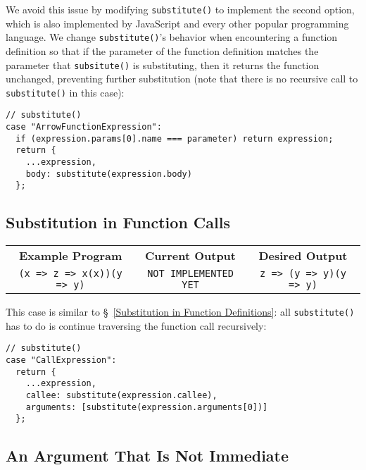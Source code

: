 \documentclass[12pt, oneside]{book}
\begin{document}
We avoid this issue by modifying \texttt{substitute()} to implement the second option, which is also implemented by JavaScript and every other popular programming language. We change \texttt{substitute()}’s behavior when encountering a function definition so that if the parameter of the function definition matches the parameter that \texttt{subsitute()} is substituting, then it returns the function unchanged, preventing further substitution (note that there is no recursive call to \texttt{substitute()} in this case):

\begin{verbatim}
// substitute()
case "ArrowFunctionExpression":
  if (expression.params[0].name === parameter) return expression;
  return {
    ...expression,
    body: substitute(expression.body)
  };
\end{verbatim}

\subsection{Substitution in Function Calls}

\begin{center}
\begin{tabular}{c|c|c}
\textbf{Example Program} & \textbf{Current Output} & \textbf{Desired Output} \\
\texttt{(x => z => x(x))(y => y)} & \texttt{NOT IMPLEMENTED YET} & \texttt{z => (y => y)(y => y)} \\
\end{tabular}
\end{center}

\noindent This case is similar to §~\ref{Substitution in Function Definitions}: all \texttt{substitute()} has to do is continue traversing the function call recursively:

\begin{verbatim}
// substitute()
case "CallExpression":
  return {
    ...expression,
    callee: substitute(expression.callee),
    arguments: [substitute(expression.arguments[0])]
  };
\end{verbatim}

\subsection{An Argument That Is Not Immediate}
\label{An Argument That Is Not Immediate}
\end{document}
